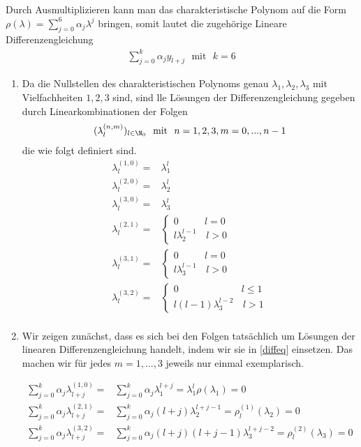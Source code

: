 \begin{solution}
Durch Ausmultiplizieren kann man das charakteristische Polynom auf die Form $\rho(\lambda) = \sum_{j=0}^{6}\alpha_j \lambda^j$ bringen, somit lautet die zugehörige Lineare Differenzengleichung
\begin{align}\label{diffeq}
  \sum_{j=0}^{k} \alpha_j y_{l+j} \text{~~mit~~} k=6
\end{align}
\begin{enumerate}[label = \textbf{\alph*)}]
  \item Da die Nullstellen des charakteristischen Polynoms genau $\lambda_1,\lambda_2,\lambda_3$
  mit Vielfachheiten $1,2,3$ sind, sind
  lle Lösungen der Differenzengleichung gegeben durch Linearkombinationen der Folgen
  \begin{align*}
    (\lambda_{l}^{(n,m)})_{l \in \N_0} \text{~~mit~~} n = 1,2,3, m = 0,...,n-1
  \end{align*}
  die wie folgt definiert sind.
  \begin{align*}
    \lambda_{l}^{(1,0)} =& \lambda_1^l \\
    \lambda_{l}^{(2,0)} =& \lambda_2^l \\
    \lambda_{l}^{(3,0)} =& \lambda_3^l \\
    \lambda_{l}^{(2,1)} =& \begin{cases}
0 & l = 0 \\
l \lambda_2^{l-1} & \, l > 0
\end{cases} \\
    \lambda_{l}^{(3,1)} =& \begin{cases}
0 & l = 0 \\
l \lambda_3^{l-1} & \, l > 0
\end{cases} \\
    \lambda_{l}^{(3,2)} =& \begin{cases}
0 & l \leq 1 \\
l(l-1) \lambda_3^{l-2} & \, l > 1
\end{cases} \\
  \end{align*}

  \item Wir zeigen zunächst, dass es sich bei den Folgen tatsächlich um Lösungen der linearen Differenzengleichung handelt, indem wir sie in \eqref{diffeq} einsetzen. Das machen wir für jedes $m=1,...,3$ jeweils nur einmal exemplarisch.

  \begin{align*}
    \sum_{j=0}^{k} \alpha_j \lambda_{l+j}^{(1,0)} =& \sum_{j=0}^{k} \alpha_j \lambda_1^{l+j} = \lambda_1^l \rho(\lambda_1) = 0 \\
    \sum_{j=0}^{k} \alpha_j \lambda_{l+j}^{(2,1)} =& \sum_{j=0}^{k} \alpha_j (l+j)\lambda_2^{l+j-1} = \rho_l^{(1)}(\lambda_2) = 0 \\
    \sum_{j=0}^{k} \alpha_j \lambda_{l+j}^{(3,2)} =& \sum_{j=0}^{k} \alpha_j (l+j)(l+j-1)\lambda_3^{l+j-2} = \rho_l^{(2)}(\lambda_3) = 0
  \end{align*}


\end{enumerate}
\end{solution}
